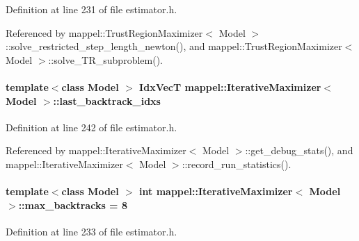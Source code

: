 Definition at line 231 of file estimator.\+h.



Referenced by mappel\+::\+Trust\+Region\+Maximizer$<$ Model $>$\+::solve\+\_\+restricted\+\_\+step\+\_\+length\+\_\+newton(), and mappel\+::\+Trust\+Region\+Maximizer$<$ Model $>$\+::solve\+\_\+\+T\+R\+\_\+subproblem().

\paragraph[{\texorpdfstring{last\+\_\+backtrack\+\_\+idxs}{last_backtrack_idxs}}]{\setlength{\rightskip}{0pt plus 5cm}template$<$class Model $>$ {\bf Idx\+VecT} {\bf mappel\+::\+Iterative\+Maximizer}$<$ Model $>$\+::last\+\_\+backtrack\+\_\+idxs\hspace{0.3cm}{\ttfamily [protected]}}\hypertarget{classmappel_1_1IterativeMaximizer_a80280950668483fccde55616ecc38b7b}{}\label{classmappel_1_1IterativeMaximizer_a80280950668483fccde55616ecc38b7b}


Definition at line 242 of file estimator.\+h.



Referenced by mappel\+::\+Iterative\+Maximizer$<$ Model $>$\+::get\+\_\+debug\+\_\+stats(), and mappel\+::\+Iterative\+Maximizer$<$ Model $>$\+::record\+\_\+run\+\_\+statistics().

\paragraph[{\texorpdfstring{max\+\_\+backtracks}{max_backtracks}}]{\setlength{\rightskip}{0pt plus 5cm}template$<$class Model $>$ int {\bf mappel\+::\+Iterative\+Maximizer}$<$ Model $>$\+::max\+\_\+backtracks = 8\hspace{0.3cm}{\ttfamily [protected]}}\hypertarget{classmappel_1_1IterativeMaximizer_a72148f311140be63ded9794921a7c112}{}\label{classmappel_1_1IterativeMaximizer_a72148f311140be63ded9794921a7c112}


Definition at line 233 of file estimator.\+h.



